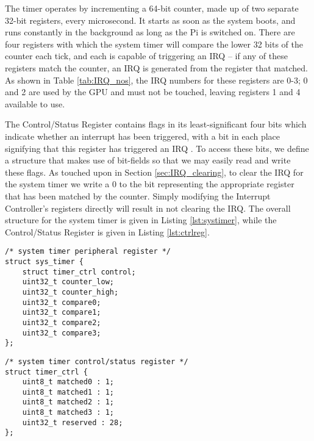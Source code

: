     The timer operates by incrementing a 64-bit counter, made up of two separate
    32-bit registers, every microsecond. It starts as soon as the system boots,
    and runs constantly in the background as long as the Pi is switched on.
    There are four registers with which the system timer will compare the lower
    32 bits of the counter each tick, and each is capable of triggering an IRQ
    -- if any of these registers match the counter, an IRQ is generated from
    the register that matched. As shown in Table \ref{tab:IRQ_nos}, the IRQ
    numbers for these registers are 0-3; 0 and 2 are used by the GPU and must
    not be touched, leaving registers 1 and 4 available to use.

    The Control/Status Register contains flags in its least-significant four
    bits which indicate whether an interrupt has been triggered, with a bit in
    each place signifying that this register has triggered an IRQ
    \cite[pg.~173]{BCM2835}. To access these bits, we define a structure that
    makes use of bit-fields so that we may easily read and write these flags. As
    touched upon in Section \ref{sec:IRQ_clearing}, to clear the IRQ for the
    system timer we write a 0 to the bit representing the appropriate register
    that has been matched by the counter. Simply modifying the Interrupt
    Controller's registers directly will result in not clearing the IRQ. The
    overall structure for the system timer is given in Listing
    \ref{lst:systimer}, while the Control/Status Register is given in Listing
    \ref{lst:ctrlreg}.

    \lstset{language=c}
    \begin{lstlisting}[caption={The System
    Timer},captionpos=b,label={lst:systimer}]
/* system timer peripheral register */
struct sys_timer {
    struct timer_ctrl control;
    uint32_t counter_low;
    uint32_t counter_high;
    uint32_t compare0;
    uint32_t compare1;
    uint32_t compare2;
    uint32_t compare3;
};
    \end{lstlisting}

    \lstset{language=c}
    \begin{lstlisting}[caption={The Control/Status
    Register},captionpos=b,label={lst:ctrlreg}]
/* system timer control/status register */
struct timer_ctrl {
    uint8_t matched0 : 1;
    uint8_t matched1 : 1;
    uint8_t matched2 : 1;
    uint8_t matched3 : 1;
    uint32_t reserved : 28;
};
    \end{lstlisting}

